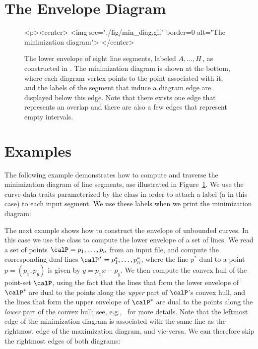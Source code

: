 \section{The Envelope Diagram}
\label{env2_sec:env_diag}

\begin{figure}[t]
\begin{ccTexOnly}
  \begin{center}
  \end{center}
\end{ccTexOnly}
\begin{ccHtmlOnly}
  <p><center>
  <img src="./fig/min_diag.gif" border=0 alt="The minimization diagram">
  </center>
\end{ccHtmlOnly}
\caption{The lower envelope of eight line segments, labeled
$A, \ldots, H$\,, as constructed in .
The minimization diagram is shown at the bottom, where
each diagram vertex points to the point associated with it, and the
labels of the segment that induce a diagram edge are displayed below
this edge. Note that there exists one edge that represents an overlap
and there are also a few edges that represent empty
intervals.\label{env2_fig:min_diag}}
\end{figure}

\section{Examples}

The following example demonstrates how to compute and traverse the
minimization diagram of line segments, ase illustrated in
Figure~\ref{env2_fig:min_diag}. We use the curve-data traits
parameterized by the  class in order to
attach a label (a  in this case) to each input segment.
We use these labels when we print the minimization diagram:


The next example shows how to construct the envelope of unbounded
curves. In this case we use the  class to
compute the lower envelope of a set of lines. We read a set of
points $\calP = p_1, \ldots, p_n$ from an input file, and compute the
corresponding dual lines $\calP^{*} = p^{*}_1, \ldots, p^{*}_n$, where
the line $p^{*}$ dual to a point $p = (p_x, p_y)$ is given by
$y = p_x x - p_y$. We then compute the convex hull of the point-set
$\calP$, using the fact that the lines that form the
lower envelope of $\calP^{*}$ are dual to the points along the
{\em upper} part of $\calP$'s convex hull, and the lines that form the
upper envelope of $\calP^{*}$ are dual to the points along the
{\em lower} part of the convex hull; see,
e.g.,~\cite[Section~11.4]{bkos-cgaa-00} for more details.
Note that the leftmost edge of the minimization diagram is associated
with the same line as the rightmost edge of the maximization diagram,
and vic-versa. We can therefore skip the rightmost edges of both
diagrams:

